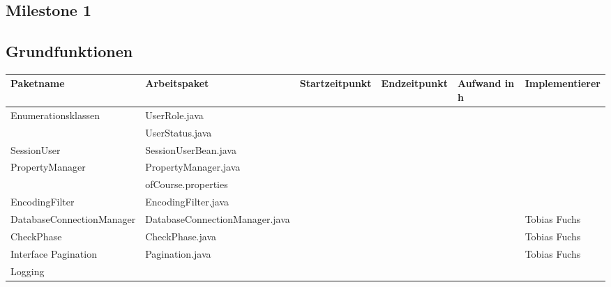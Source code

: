 \begin{landscape}
\section{Milestone 1}

\subsection{Grundfunktionen}
\begin{tabular}{|p{6cm} |p{6cm}|p{3cm}|p{3cm}|p{2cm}|p{3cm}|}
	\hline \textbf{Paketname} & \textbf{Arbeitspaket} & \textbf{Startzeitpunkt} & \textbf{Endzeitpunkt} & \textbf{Aufwand in h} & \textbf{Implementierer} \\ 
	\hline  Enumerationsklassen  & UserRole.java                            &                            &                             &                     &\\ 
	& UserStatus.java                          &                            &                             &                     &\\ 
	\hline  SessionUser          & SessionUserBean.java                     &                            &                             &                     &\\ 
	\hline  PropertyManager      & PropertyManager.java                     &                            &                             &                     &\\ 
	& ofCourse.properties                      &                            &                             &                     &\\
	\hline  EncodingFilter       & EncodingFilter.java                      &                            &                             &                     &\\ 
	\hline  DatabaseConnectionManager       &  DatabaseConnectionManager.java                      &                            &                             &              & Tobias Fuchs\\   
	\hline  CheckPhase           & CheckPhase.java                            &                            &                             &                     & Tobias Fuchs\\
	\hline  Interface Pagination & Pagination.java                            &                            &                             &                     & Tobias Fuchs\\
	\hline  Logging              &                                            &                            &                             &                     &\\ 

\end{tabular}
\end{landscape}
